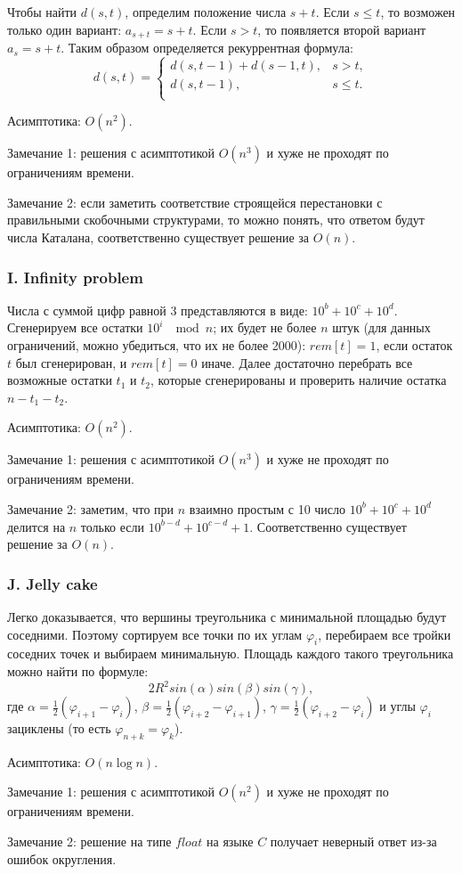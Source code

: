 Чтобы найти $d(s, t)$, определим положение числа $s + t$. Если $s \le t$, то возможен только один вариант: $a_{s+t} = s + t$. Если $s > t$, то появляется второй вариант $a_s = s + t$. Таким образом определяется рекуррентная формула:
$$
d(s, t) =
\begin{cases}
d(s, t-1) + d(s-1, t), & s > t,\\
d(s, t-1), & s \le t.\\
\end{cases}
$$

Асимптотика: $O(n^2)$. 

Замечание 1: решения с асимптотикой $O(n^3)$ и хуже не проходят по ограничениям времени.

Замечание 2: если заметить соответствие строящейся перестановки с правильными скобочными структурами, то можно понять, что ответом будут числа Каталана, соответственно существует решение за $O(n)$.



\subsubsection*{I. Infinity problem} 


Числа с суммой цифр равной 3 представляются в виде: $10^b + 10^c + 10^d$. Сгенерируем все остатки $10^i \; \mod n$; их будет не более $n$ штук (для данных ограничений, можно убедиться, что их не более 2000): $rem[t] = 1$, если остаток $t$ был сгенерирован, и $rem[t] = 0$ иначе. Далее достаточно перебрать все возможные остатки $t_1$ и $t_2$, которые сгенерированы и проверить наличие остатка $n - t_1 - t_2$.

Асимптотика: $O(n^2)$.

Замечание 1: решения с асимптотикой $O(n^3)$ и хуже не проходят по ограничениям времени.

Замечание 2: заметим, что при $n$ взаимно простым с 10 число $10^b + 10^c + 10^d$ делится на $n$ только если $10^{b-d} + 10^{c-d} + 1$. Соответственно существует решение за $O(n)$.



\subsubsection*{J. Jelly cake} 


Легко доказывается, что вершины треугольника с минимальной площадью будут соседними. Поэтому сортируем все точки по их углам $\varphi_i$, перебираем все тройки соседних точек и выбираем минимальную. Площадь каждого такого треугольника можно найти по формуле:
$$2 R^2 sin(\alpha) sin(\beta) sin(\gamma),$$
где $\alpha = \frac12 (\varphi_{i+1} - \varphi_{i})$, $\beta = \frac12 (\varphi_{i+2} - \varphi_{i+1})$, $\gamma= \frac12 (\varphi_{i+2} - \varphi_{i})$ и углы $\varphi_i$ зациклены (то есть $\varphi_{n+k} = \varphi_{k}$).

Асимптотика: $O(n \log n)$.

Замечание 1: решения с асимптотикой $O(n^2)$ и хуже не проходят по ограничениям времени.

Замечание 2: решение на типе $float$ на языке $C$ получает неверный ответ из-за ошибок округления.